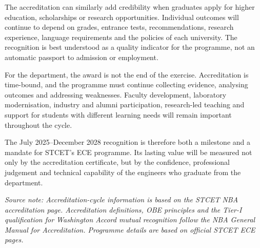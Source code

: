 {\medskip
\noindent
The accreditation can similarly add credibility when graduates apply for higher education, scholarships or research opportunities. Individual outcomes will continue to depend on grades, entrance tests, recommendations, research experience, language requirements and the policies of each university. The recognition is best understood as a quality indicator for the programme, not an automatic passport to admission or employment.

\medskip
\noindent
For the department, the award is not the end of the exercise. Accreditation is time-bound, and the programme must continue collecting evidence, analysing outcomes and addressing weaknesses. Faculty development, laboratory modernisation, industry and alumni participation, research-led teaching and support for students with different learning needs will remain important throughout the cycle.

\medskip
\noindent
The July 2025--December 2028 recognition is therefore both a milestone and a mandate for STCET's ECE programme. Its lasting value will be measured not only by the accreditation certificate, but by the confidence, professional judgement and technical capability of the engineers who graduate from the department.
\par}

\vfill
\noindent
{\footnotesize\sloppy\textit{Source note: Accreditation-cycle information is based on the  STCET NBA accreditation page. Accreditation definitions, OBE principles and the Tier-I qualification for Washington Accord mutual recognition follow the NBA General Manual for Accreditation. Programme details are based on official STCET ECE pages.}\par}